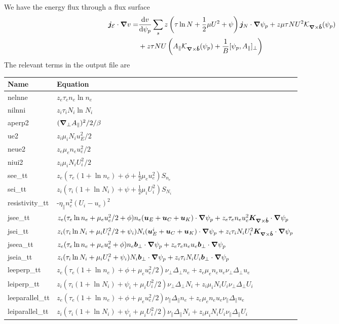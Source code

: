 We have the energy flux through a flux surface
\begin{align}
 \vec j_{\mathcal E}\cn v =&%
\frac{\d v}{\d \psi_p}\sum_s z\left (\tau\ln N + \frac{1}{2}\mu U^2 + \psi\right) \vec j_N\cn\psi_p
+ z \mu\tau NU^2 \mathcal K_{\vn\times\bhat}(\psi_p) \nonumber\\
&+ z \tau NU
 \left( A_\parallel \mathcal
 K_{\vn\times\bhat}(\psi_p) + \frac{1}{B}[\psi_p, A_\parallel]_\perp\right)
\label{eq:energy_flux}
\end{align}
The relevant terms in the output file are
\begin{longtable}{ll}
\toprule
\rowcolor{gray!50}\textbf{Name} &  \textbf{Equation}\\
\midrule
    nelnne &$ z_e\tau_e n_e \ln n_e$ \\
    nilnni &$ z_i\tau_i N_i \ln N_i$ \\
    aperp2 &$ ({\boldsymbol{\nabla}}_{\perp} A_\parallel)^2/2/\beta$ \\
    ue2   &$z_i\mu_i N_i u_E^2 /2$ \\
    neue2 &$ z_e\mu_e n_e u_e^2/2$ \\
    niui2 &$ z_i\mu_i N_i U_i^2/2$ \\
    see\_tt & $z_e(\tau_e (1+\ln n_e) + \phi + \frac{1}{2}\mu_e u_e^2) S_{n_e} $ \\
    sei\_tt & $z_i(\tau_i (1+\ln N_i) + \psi + \frac{1}{2}\mu_i U_i^2) S_{N_i} $ \\
    resistivity\_tt &-$\eta_\parallel n_e^2 (U_i-u_e)^2$ \\
    jsee\_tt &$z_e(\tau_e \ln n_e + \mu_e u_e^2/2 + \phi)n_e({\boldsymbol{u}}_E + {\boldsymbol{u}}_C + {\boldsymbol{u}}_K)\cdot{\boldsymbol{\nabla}} \psi_p
        + z_e \tau_e n_e u_e^2 {\boldsymbol{K}}_{{\boldsymbol{\nabla}}\times\bm{\hat{b}}}\cdot{\boldsymbol{\nabla}} \psi_p$ \\
    jsei\_tt &$z_i(\tau_i \ln N_i + \mu_i U_i^2/2 + \psi_i)N_i({\boldsymbol{u}}_E^i + {\boldsymbol{u}}_C + {\boldsymbol{u}}_K)\cdot{\boldsymbol{\nabla}} \psi_p
        + z_i \tau_i N_i U_i^2 {\boldsymbol{K}}_{{\boldsymbol{\nabla}}\times\bm{\hat{b}}}\cdot{\boldsymbol{\nabla}} \psi_p$ \\
    jseea\_tt &$z_e(\tau_e \ln n_e + \mu_e u_e^2 + \phi)n_e {\boldsymbol{ b}}_\perp\cdot{\boldsymbol{\nabla}} \psi_p
        + z_e \tau_e n_e u_e {\boldsymbol{ b}}_\perp \cdot{\boldsymbol{\nabla}} \psi_p $ \\
    jseia\_tt &$z_i(\tau_i \ln N_i + \mu_i U_i^2 + \psi_i)N_i {\boldsymbol{ b}}_\perp\cdot{\boldsymbol{\nabla}} \psi_p
        + z_i \tau_i N_i U_i {\boldsymbol{ b}}_\perp \cdot{\boldsymbol{\nabla}} \psi_p $ \\
    leeperp\_tt &$z_e(\tau_e(1+\ln n_e) + \phi + \mu_eu_e^2/2) \nu_\perp \Delta_\perp n_e + z_e\mu_e n_e u_e \nu_\perp \Delta_\perp u_e$ \\
    leiperp\_tt &$z_i(\tau_i(1+\ln N_i) + \psi_i + \mu_iU_i^2/2) \nu_\perp \Delta_\perp N_i + z_i\mu_i N_i U_i \nu_\perp \Delta_\perp U_i$ \\
    leeparallel\_tt &$z_e(\tau_e(1+\ln n_e) + \phi + \mu_eu_e^2/2) \nu_\parallel \Delta_\parallel n_e + z_e\mu_e n_e u_e \nu_\parallel \Delta_\parallel u_e$ \\
    leiparallel\_tt &$z_i(\tau_i(1+\ln N_i) + \psi_i + \mu_iU_i^2/2) \nu_\parallel \Delta_\parallel N_i + z_i\mu_i N_i U_i \nu_\parallel \Delta_\parallel U_i$ \\
\bottomrule
\end{longtable}

